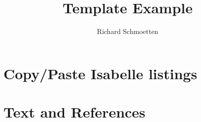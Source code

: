 \documentclass[]{article}
\title{Template Example}
\author{Richard Schmoetten}
\begin{document}
\maketitle

\section{Copy/Paste Isabelle listings}

\section{Text and References}
\end{document}
